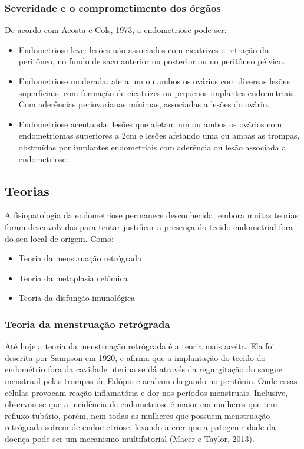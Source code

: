 \documentclass[12pt]{article} %
\begin{document}
\subsubsection{Severidade e o comprometimento dos órgãos}

De acordo com Acosta e Cols, 1973, a endometriose pode ser:

\begin{itemize}
\item Endometriose leve: lesões não associados com cicatrizes e
  retração do peritôneo, no fundo de saco anterior ou posterior ou no
  peritôneo pélvico.
\item Endometriose moderada: afeta um ou ambos os ovários com diversas
  lesões superficiais, com formação de cicatrizes ou pequenos
  implantes endometriais. Com aderências periovarianas mínimas,
  associadas a lesões do ovário.
\item Endometriose acentuada: lesões que afetam um ou ambos os ovários
  com endometriomas superiores a 2cm e lesões afetando uma ou ambas as
  trompas, obstruídas por implantes endometriais com aderência ou
  lesão associada a endometriose.
\end{itemize}

\subsection{Teorias}

A fisiopatologia da endometriose permanece desconhecida, embora muitas
teorias foram desenvolvidas para tentar justificar a presença do
tecido endometrial fora do seu local de origem. Como:

\begin{itemize}
\item Teoria da menstruação retrógrada
\item Teoria da metaplasia celômica
\item Teoria da disfunção imunológica
\end{itemize}


\subsubsection{Teoria da menstruação retrógrada}

Até hoje a teoria da menstruação retrógrada é a teoria mais
aceita. Ela foi descrita por Sampson em 1920, e afirma que a
implantação do tecido do endométrio fora da cavidade uterina se dá
através da regurgitação do sangue menstrual pelas trompas de Falópio e
acabam chegando no peritônio. Onde essas células provocam reação
inflamatória e dor nos períodos menstruais. Inclusive, observou-se que
a incidência de endometriose é maior em mulheres que tem refluxo
tubário, porém, nem todas as mulheres que possuem menstruação
retrógrada sofrem de endometriose, levando a crer que a patogenicidade
da doença pode ser um mecanismo multifatorial (Macer e Taylor, 2013).
\end{document}
